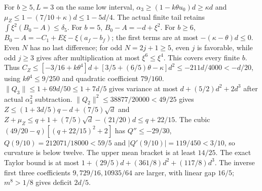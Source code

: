 For $b\ge5,L=3$ on the same low interval,
$\alpha_3\ge(1-k\theta u_0)d\ge\kappa d$ and
$\mu_Z\le1-(7/10+\kappa)d\le1-5d/4$.
The actual finite tail retains
$\int\xi^2(B_0-A)\le\delta_5$.
For $b=5$, $B_0-A=-d+\xi^2$.
For $b\ge6$, $B_0-A=-C_1+E\xi-\xi(a_f-b_f)$;
the first terms are at most $-(\kappa-\theta)d\le0$.
Even $N$ has no last difference; for odd $N=2j+1\ge5$, even $j$
is favorable, while odd $j\ge3$ gives after multiplication at most
$\xi^6\le\xi^4$. This covers every finite $b$.
Thus
$C_Z\le[-3/16+k\theta^4]d+[3/5+(6/5)\theta-\kappa]d^2
\le-211d/4000<-d/20$, using $k\theta^4\le9/250$ and quadratic
coefficient $79/160$.
$\|Q_3\|\le1+69d/50\le1+7d/5$ gives variance at most
$d+(5/2)d^2+2d^3$ after actual $\alpha_3^2$ subtraction.
$\|Q_2\|^2\le38877/20000<49/25$ gives
$Z\le(1+3d/5)q-d+(7/5)\sqrt d$ and
$Z+\mu_Z\le q+1+(7/5)\sqrt d-(21/20)d\le q+22/15$.
The cubic $(49/20-q)[(q+22/15)^2+2]$ has $Q''\le-29/30$,
$Q(9/10)=212071/18000<59/5$ and $|Q'(9/10)|=119/450<3/10$,
so curvature is below twelve.
The upper mean bracket is at least $14/25$.
The exact Taylor bound is at most
$1+(29/5)d+(361/8)d^2+(117/8)d^3$.
The inverse first three coefficients $9,729/16,10935/64$ are larger,
with linear gap $16/5$; $m^8>1/8$ gives deficit $2d/5$.

